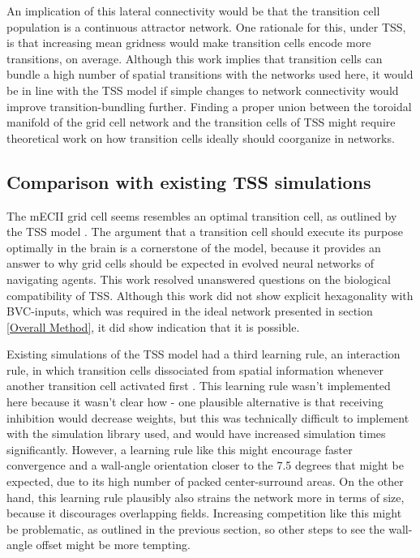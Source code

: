 \documentclass{article}
\begin{document}
    An implication of this lateral connectivity would be that the transition cell population is a continuous attractor network. One rationale for this, under TSS, is that increasing mean gridness would make transition cells encode more transitions, on average. Although this work implies that transition cells can bundle a high number of spatial transitions with the networks used here, it would be in line with the TSS model if simple changes to network connectivity would improve transition-bundling further. Finding a proper union between the toroidal manifold of the grid cell network and the transition cells of TSS might require theoretical work on how transition cells ideally should coorganize in networks.
    
    \subsection{Comparison with existing TSS simulations} \label{TSS model comparison}

    The mECII grid cell seems resembles an optimal transition cell, as outlined by the TSS model \parencite{Waniek2020}. The argument that a transition cell should execute its purpose optimally in the brain is a cornerstone of the model, because it provides an answer to why grid cells should be expected in evolved neural networks of navigating agents. This work resolved unanswered questions on the biological compatibility of TSS. Although this work did not show explicit hexagonality with BVC-inputs, which was required in the ideal network presented in section \ref{Overall Method}, it did show indication that it is possible.

    Existing simulations of the TSS model had a third learning rule, an interaction rule, in which transition cells dissociated from spatial information whenever another transition cell activated first \parencite{Waniek2017}. This learning rule wasn't implemented here because it wasn't clear how - one plausible alternative is that receiving inhibition would decrease weights, but this was technically difficult to implement with the simulation library used, and would have increased simulation times significantly. However, a learning rule like this might encourage faster convergence and a wall-angle orientation closer to the 7.5 degrees that might be expected, due to its high number of packed center-surround areas. On the other hand, this learning rule plausibly also strains the network more in terms of size, because it discourages overlapping fields. Increasing competition like this might be problematic, as outlined in the previous section, so other steps to see the wall-angle offset might be more tempting.
\end{document}
